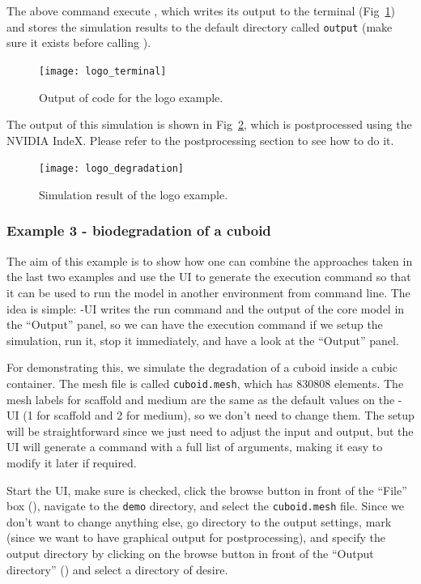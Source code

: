 The above command execute \biodeg{}, which writes its output to the terminal (Fig~\ref{fig:logo_terminal}) and stores the simulation results to the default directory called \verb|output| (make sure it exists before calling \biodeg{}). 

\begin{figure}[h]
\center \texttt{[image: logo\_terminal]}
\caption{Output of \biodeg{} code for the logo example.} \label{fig:logo_terminal}
\end{figure}

The output of this simulation is shown in Fig~\ref{fig:logo_degradation}, which is postprocessed using the NVIDIA IndeX. Please refer to the postprocessing section to see how to do it.

\begin{figure}[h]
\center \texttt{[image: logo\_degradation]}
\caption{Simulation result of the logo example.} \label{fig:logo_degradation}
\end{figure}

\subsubsection{Example 3 - biodegradation of a cuboid}\label{sec:example3}

The aim of this example is to show how one can combine the approaches taken in the last two examples and use the UI to generate the execution command so that it can be used to run the model in another environment from command line. The idea is simple: \biodeg{}-UI writes the run command and the output of the core model in the ``Output'' panel, so we can have the execution command if we setup the simulation, run it, stop it immediately, and have a look at the ``Output'' panel.

For demonstrating this, we simulate the degradation of a cuboid inside a cubic container. The mesh file is called \verb|cuboid.mesh|, which has $\num{830808}$ elements. The mesh labels for scaffold and medium are the same as the default values on the \biodeg{}-UI (1 for scaffold and 2 for medium), so we don't need to change them. The setup will be straightforward since we just need to adjust the input and output, but the UI will generate a command with a full list of arguments, making it easy to modify it later if required.

Start the UI,
make sure  is checked, click the browse button in front of the ``File'' box (), navigate to the \verb|demo| directory, and select the \verb|cuboid.mesh| file. Since we don't want to change anything else, go directory to the output settings, mark
  (since we want to have graphical output for postprocessing), and specify the output directory by clicking on the browse button in front of the ``Output directory'' () and select a directory of desire. 
 
